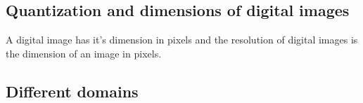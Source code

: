\subsection{Quantization and dimensions of digital images}
A digital image has it's dimension in pixels and the resolution of digital images is the dimension of an image in pixels.

\subsection{Different domains}
